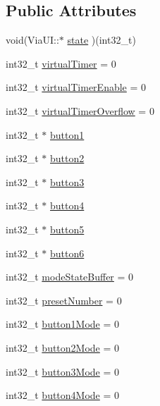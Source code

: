 \subsection*{Public Attributes}
\begin{DoxyCompactItemize}
\item 
void(Via\+U\+I\+::$\ast$ \mbox{\hyperlink{class_via_u_i_a2a76b36f571915b19355c7edde8a1e51}{state}} )(int32\+\_\+t)
\item 
int32\+\_\+t \mbox{\hyperlink{class_via_u_i_ad745eabb8155c8cff717186abd592c31}{virtual\+Timer}} = 0
\item 
int32\+\_\+t \mbox{\hyperlink{class_via_u_i_af3a32c849a2beba464d1dfcfd4e60e03}{virtual\+Timer\+Enable}} = 0
\item 
int32\+\_\+t \mbox{\hyperlink{class_via_u_i_ad3c77ffd0df89def606de5120e4ace3a}{virtual\+Timer\+Overflow}} = 0
\item 
int32\+\_\+t $\ast$ \mbox{\hyperlink{class_via_u_i_ae21314791ad42cf8861de1805f7215f3}{button1}}
\item 
int32\+\_\+t $\ast$ \mbox{\hyperlink{class_via_u_i_aa4c4d36de9b8fe45760f82ec27ef38c5}{button2}}
\item 
int32\+\_\+t $\ast$ \mbox{\hyperlink{class_via_u_i_a21b5860f22c411180962f666536275a8}{button3}}
\item 
int32\+\_\+t $\ast$ \mbox{\hyperlink{class_via_u_i_ac44fee28673f0ac9ccff114b33332ace}{button4}}
\item 
int32\+\_\+t $\ast$ \mbox{\hyperlink{class_via_u_i_a0a6dd5e3f8dbd2d022cc583d3be36b73}{button5}}
\item 
int32\+\_\+t $\ast$ \mbox{\hyperlink{class_via_u_i_aed379b5b020972bf3d54b8af10f65679}{button6}}
\item 
int32\+\_\+t \mbox{\hyperlink{class_via_u_i_a8a81f061606813d7892008085ac49177}{mode\+State\+Buffer}} = 0
\item 
int32\+\_\+t \mbox{\hyperlink{class_via_u_i_ab9291e1380236cd7a47c61682764af74}{preset\+Number}} = 0
\item 
int32\+\_\+t \mbox{\hyperlink{class_via_u_i_a8d86fda886f62fb6b309b4e877351fd7}{button1\+Mode}} = 0
\item 
int32\+\_\+t \mbox{\hyperlink{class_via_u_i_a7efad7acb6db1c15f67ad03adc549376}{button2\+Mode}} = 0
\item 
int32\+\_\+t \mbox{\hyperlink{class_via_u_i_a333cb2f60cdd7dec0ffd45ad4aac31c4}{button3\+Mode}} = 0
\item 
int32\+\_\+t \mbox{\hyperlink{class_via_u_i_a571d0626912f4067cf893134506d9aa4}{button4\+Mode}} = 0

\end{DoxyCompactItemize}
